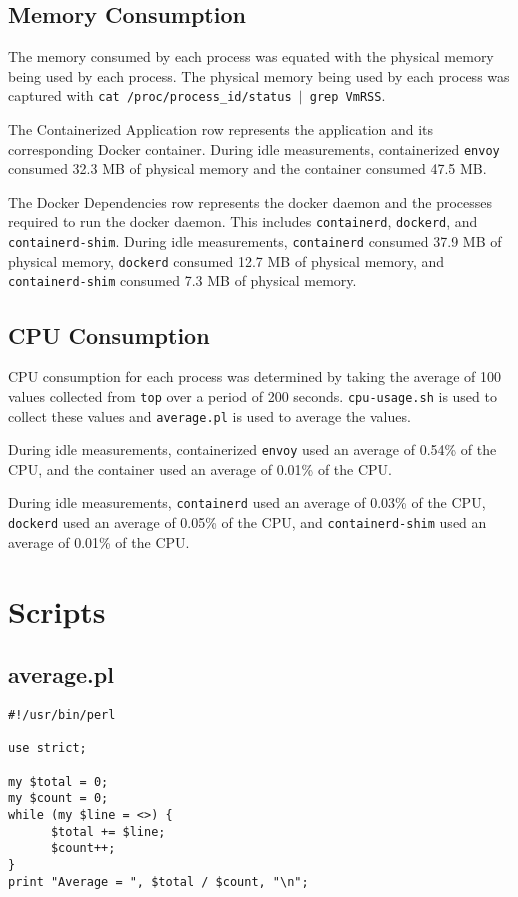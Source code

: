 \documentclass{article}
\begin{document}
\subsection{Memory Consumption}
The memory consumed by each process was equated with the physical memory being used by each process. The physical memory being used by each process was captured with \texttt{cat /proc/process\_id/status $|$ grep VmRSS}.

The Containerized Application row represents the application and its corresponding Docker container. During idle measurements, containerized \texttt{envoy} consumed 32.3 MB of physical memory and the container consumed 47.5 MB.

The Docker Dependencies row represents the docker daemon and the processes required to run the docker daemon. This includes \texttt{containerd}, \texttt{dockerd}, and \texttt{containerd-shim}. During idle measurements, \texttt{containerd} consumed 37.9 MB of physical memory, \texttt{dockerd} consumed 12.7 MB of physical memory, and \texttt{containerd-shim} consumed 7.3 MB of physical memory.

\subsection{CPU Consumption}
CPU consumption for each process was determined by taking the average of 100 values collected from \texttt{top} over a period of 200 seconds. \texttt{cpu-usage.sh} is used to collect these values and \texttt{average.pl} is used to average the values.

During idle measurements, containerized \texttt{envoy} used an average of 0.54\% of the CPU, and the container used an average of 0.01\% of the CPU.

During idle measurements, \texttt{containerd} used an average of 0.03\% of the CPU, \texttt{dockerd} used an average of 0.05\% of the CPU, and \texttt{containerd-shim} used an average of 0.01\% of the CPU.

\section{Scripts}
\subsection{average.pl}
\begin{verbatim}
#!/usr/bin/perl

use strict;

my $total = 0;
my $count = 0;
while (my $line = <>) {
      $total += $line;
      $count++;
}
print "Average = ", $total / $count, "\n";
\end{verbatim}
\end{document}
